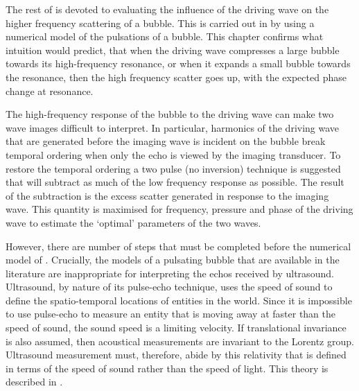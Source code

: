 



The rest of  is devoted to evaluating the influence
of the driving wave on the higher frequency scattering of a bubble.
This is carried out in 
by using a numerical model of the pulsations of a bubble.
This chapter confirms what intuition would predict, 
that when the driving wave compresses a large bubble towards its high-frequency resonance, 
or when it expands a small bubble towards the  resonance, then the high frequency scatter goes up,
with the expected phase change at resonance.

The high-frequency response of the bubble to the driving wave can make two wave images difficult to interpret.
In particular, harmonics of the driving wave that are generated before the imaging wave is incident on the bubble
break temporal ordering when only the echo is viewed by the imaging transducer.
To restore the temporal ordering a two pulse (no inversion) technique is suggested that will subtract as much of the low frequency response as possible.
The result of the subtraction is the excess scatter generated in response to the imaging wave.
This quantity is maximised for frequency, pressure and phase of the driving wave to estimate the `optimal' parameters of the two waves.


However, there are number of steps that must be completed before the numerical model of .
Crucially, the models of a pulsating bubble that are available in the literature
are inappropriate for interpreting the echos received by ultrasound.
Ultrasound, by nature of its pulse-echo technique,
uses the speed of sound to define the spatio-temporal locations of entities in the world.
Since it is impossible to use pulse-echo to measure an entity that is moving away at faster than the speed of sound,
the sound speed is a limiting velocity.
If translational invariance is also assumed,  then acoustical measurements are  invariant to the Lorentz group.
Ultrasound measurement must,
therefore, 
abide by this relativity that is
defined in terms of the speed of sound rather than the speed of light.
This theory is described in .

